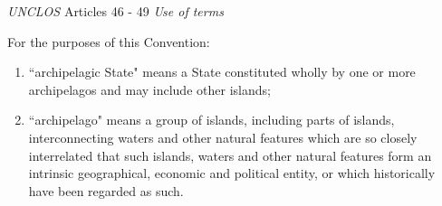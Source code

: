 \begin{conventiondetails}{\textit{UNCLOS} Articles 46 - 49}
    \flushleft
    \textit{Use of terms}

    \vspace{\baselineskip}

    For the purposes of this Convention:
    \begin{enumerate}[label=(\alph*)]
        \item ``archipelagic State" means a State constituted wholly by one or more archipelagos and may include other islands;
        \item ``archipelago" means a group of islands, including parts of islands, interconnecting waters and other natural features which are so closely interrelated that such islands, waters and other natural features form an intrinsic geographical, economic and political entity, or which historically have been regarded as such.
    \end{enumerate}


\end{conventiondetails}
